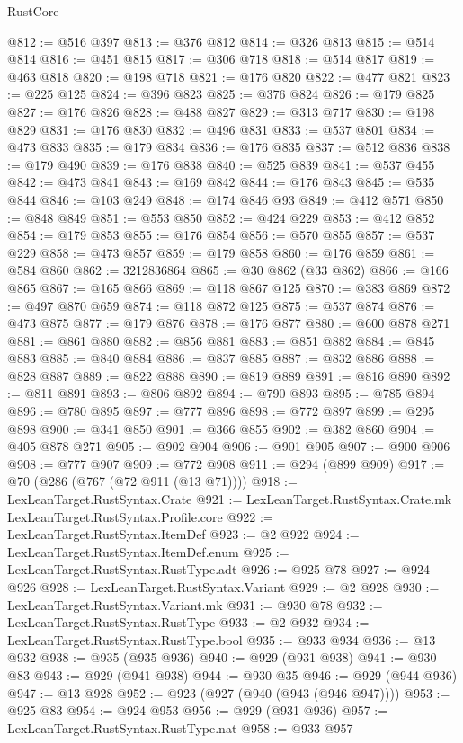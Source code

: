 \begin{lexlean}{RustCore}
\begin{coremodule}
@812 := @516 @397
@813 := @376 @812
@814 := @326 @813
@815 := @514 @814
@816 := @451 @815
@817 := @306 @718
@818 := @514 @817
@819 := @463 @818
@820 := @198 @718
@821 := @176 @820
@822 := @477 @821
@823 := @225 @125
@824 := @396 @823
@825 := @376 @824
@826 := @179 @825
@827 := @176 @826
@828 := @488 @827
@829 := @313 @717
@830 := @198 @829
@831 := @176 @830
@832 := @496 @831
@833 := @537 @801
@834 := @473 @833
@835 := @179 @834
@836 := @176 @835
@837 := @512 @836
@838 := @179 @490
@839 := @176 @838
@840 := @525 @839
@841 := @537 @455
@842 := @473 @841
@843 := @169 @842
@844 := @176 @843
@845 := @535 @844
@846 := @103 @249
@848 := @174 @846 @93
@849 := @412 @571
@850 := @848 @849
@851 := @553 @850
@852 := @424 @229
@853 := @412 @852
@854 := @179 @853
@855 := @176 @854
@856 := @570 @855
@857 := @537 @229
@858 := @473 @857
@859 := @179 @858
@860 := @176 @859
@861 := @584 @860
@862 := 3212836864
@865 := @30 @862 (@33 @862)
@866 := @166 @865
@867 := @165 @866
@869 := @118 @867 @125
@870 := @383 @869
@872 := @497 @870 @659
@874 := @118 @872 @125
@875 := @537 @874
@876 := @473 @875
@877 := @179 @876
@878 := @176 @877
@880 := @600 @878 @271
@881 := @861 @880
@882 := @856 @881
@883 := @851 @882
@884 := @845 @883
@885 := @840 @884
@886 := @837 @885
@887 := @832 @886
@888 := @828 @887
@889 := @822 @888
@890 := @819 @889
@891 := @816 @890
@892 := @811 @891
@893 := @806 @892
@894 := @790 @893
@895 := @785 @894
@896 := @780 @895
@897 := @777 @896
@898 := @772 @897
@899 := @295 @898
@900 := @341 @850
@901 := @366 @855
@902 := @382 @860
@904 := @405 @878 @271
@905 := @902 @904
@906 := @901 @905
@907 := @900 @906
@908 := @777 @907
@909 := @772 @908
@911 := @294 (@899 @909)
@917 := @70 (@286 (@767 (@72 @911 (@13 @71))))
@918 := LexLeanTarget.RustSyntax.Crate
@921 := LexLeanTarget.RustSyntax.Crate.mk LexLeanTarget.RustSyntax.Profile.core
@922 := LexLeanTarget.RustSyntax.ItemDef
@923 := @2 @922
@924 := LexLeanTarget.RustSyntax.ItemDef.enum
@925 := LexLeanTarget.RustSyntax.RustType.adt
@926 := @925 @78
@927 := @924 @926
@928 := LexLeanTarget.RustSyntax.Variant
@929 := @2 @928
@930 := LexLeanTarget.RustSyntax.Variant.mk
@931 := @930 @78
@932 := LexLeanTarget.RustSyntax.RustType
@933 := @2 @932
@934 := LexLeanTarget.RustSyntax.RustType.bool
@935 := @933 @934
@936 := @13 @932
@938 := @935 (@935 @936)
@940 := @929 (@931 @938)
@941 := @930 @83
@943 := @929 (@941 @938)
@944 := @930 @35
@946 := @929 (@944 @936)
@947 := @13 @928
@952 := @923 (@927 (@940 (@943 (@946 @947))))
@953 := @925 @83
@954 := @924 @953
@956 := @929 (@931 @936)
@957 := LexLeanTarget.RustSyntax.RustType.nat
@958 := @933 @957

\end{coremodule}
\end{lexlean}
